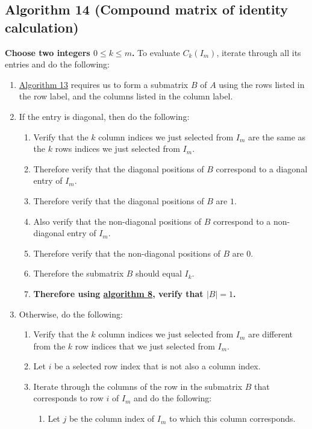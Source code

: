 \documentclass[twocolumn]{article}
\begin{document}
		\subsection{Algorithm 14 (Compound matrix of identity calculation)}\label{sec:algorithm 14}
			\textbf{Choose two integers $0\le k\le m$.} To evaluate $C_k(I_m)$, iterate through all its entries and do the following:
			\begin{enumerate}
				\item \hyperref[sec:algorithm 13]{Algorithm 13} requires us to form a submatrix $B$ of $A$ using the rows listed in the row label, and the columns listed in the column label.
				\item If the entry is diagonal, then do the following:
				\begin{enumerate}
					\item Verify that the $k$ column indices we just selected from $I_m$ are the same as the $k$ rows indices we just selected from $I_m$.
					\item Therefore verify that the diagonal positions of $B$ correspond to a diagonal entry of $I_m$.
					\item Therefore verify that the diagonal positions of $B$ are $1$.
					\item Also verify that the non-diagonal positions of $B$ correspond to a non-diagonal entry of $I_m$.
					\item Therefore verify that the non-diagonal positions of $B$ are $0$.
					\item Therefore the submatrix $B$ should equal $I_k$.
					\item \textbf{Therefore using \hyperref[sec:algorithm 8]{algorithm 8}, verify that $\lvert B\rvert=1$.}
				\end{enumerate}
				\item Otherwise, do the following:
				\begin{enumerate}
					\item Verify that the $k$ column indices we just selected from $I_m$ are different from the $k$ row indices that we just selected from $I_m$.
					\item Let $i$ be a selected row index that is not also a column index.
					\item Iterate through the columns of the row in the submatrix $B$ that corresponds to row $i$ of $I_m$ and do the following:
					\begin{enumerate}
						\item Let $j$ be the column index of $I_m$ to which this column corresponds.

\end{enumerate}
\end{enumerate}
\end{enumerate}
\end{document}

